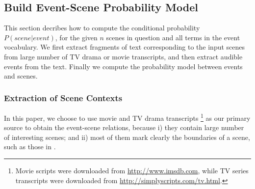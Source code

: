 \subsection{Build Event-Scene Probability Model}
\label{sec:mapping}
This section decribes how to compute the conditional probability 
$P(scene | event)$, for the given $n$ scenes in question and all 
terms in the event vocabulary. We first extract fragments of text
corresponding to the input scenes 
from large number of TV drama or movie transcripts, and then extract
audible events from the text. Finally we compute the probability model
between events and scenes. 

\subsubsection{Extraction of Scene Contexts}
In this paper, we choose to use movie and TV drama transcripts 
\footnote{Movie scripts were downloaded from \url{http://www.imsdb.com},
while TV series transcripts were downloaded from 
\url{http://simplyscripts.com/tv.html}.} as 
our primary source to obtain the event-scene relations,
because i) they contain large number of interesting scenes; and ii)
most of them mark clearly the boundaries of a scene, such as those
in .


